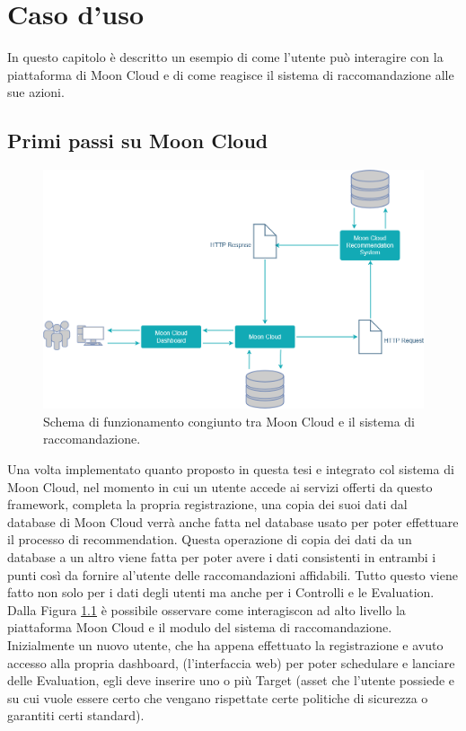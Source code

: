 \chapter{Caso d'uso}\label{chp:05-usecase}
In questo capitolo è descritto un esempio di come l'utente può interagire con la piattaforma di Moon Cloud e di come reagisce 
il sistema di raccomandazione alle sue azioni.
%
\section*{Primi passi su Moon Cloud}
\begin{figure}[ht!]
    \centering
    \includegraphics[scale=0.38]{images/UML_MoonCloud_HowToDo.png}
    \caption{Schema di funzionamento congiunto tra Moon Cloud e il sistema di raccomandazione.}
    \label{fig:UML_MoonCloud_HowToDo}
\end{figure}
\hfill\break
Una volta implementato quanto proposto in questa tesi e integrato col sistema di Moon Cloud, nel momento in cui un utente 
accede ai servizi offerti da questo framework, completa la propria registrazione, una copia dei suoi dati dal database di 
Moon Cloud verrà anche fatta nel database usato per poter effettuare il processo di recommendation. Questa operazione di 
copia dei dati da un database a un altro viene fatta per poter avere i dati consistenti in entrambi i punti così da 
fornire al'utente delle raccomandazioni affidabili. Tutto questo viene fatto non solo per i dati degli utenti ma anche 
per i Controlli e le Evaluation. Dalla Figura \ref{fig:UML_MoonCloud_HowToDo} è possibile osservare come interagiscon 
ad alto livello la piattaforma Moon Cloud e il modulo del sistema di raccomandazione.\hfill\break
Inizialmente un nuovo utente, che ha appena effettuato la registrazione e avuto accesso alla propria dashboard, (l'interfaccia 
web) per poter schedulare e lanciare delle Evaluation, egli deve inserire uno o più Target (asset che l'utente possiede e su 
cui vuole essere certo che vengano rispettate certe politiche di sicurezza o garantiti certi standard).\hfill\break
%
